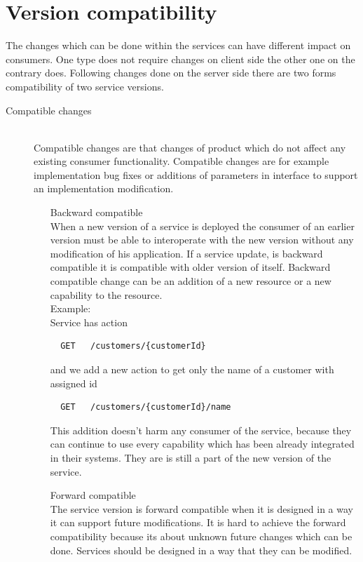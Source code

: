 \section{Version compatibility}
\label{sec:v-compat}
The changes which can be done within the services can have different impact on consumers. One type does not require changes on client side the other one on the contrary does. Following changes done on the server side there are two forms compatibility of two service versions. \cite{website:service-versioning}
\begin{description}
  \item[Compatible changes] \hfill \\
  Compatible changes are that changes of product which do not affect any existing consumer functionality. Compatible changes are for example implementation bug fixes or additions of parameters in interface to support an implementation modification.
  \begin{enumerate}
    \item[Backward compatible] \hfill \\ 
  When a new version of a service is deployed the consumer of an earlier version must be able to interoperate with the new version without any modification of his application. If a service update, is backward compatible it is compatible with older version of itself. Backward compatible change can be an addition of a new resource or a new capability to the resource. \hfill \\ 
  Example: \hfill \\ 
  Service has action \hfill \\ 
  \begin{lstlisting}
  GET   /customers/{customerId}
  \end{lstlisting}
  and we add a new action to get only the name of a customer with assigned id
  \begin{lstlisting}
  GET   /customers/{customerId}/name
  \end{lstlisting}

  This addition doesn't harm any consumer of the service, because they can continue to use every capability which has been already integrated in their systems. They are is still a part of the new version of the service. 
  
  \item[Forward compatible] \hfill \\
  The service version is forward compatible when it is designed in a way it can support future modifications. It is hard to achieve the forward compatibility because its about unknown future changes which can be done. Services should be designed in a way that they can be modified.
  \end{enumerate}
  

\end{description}
